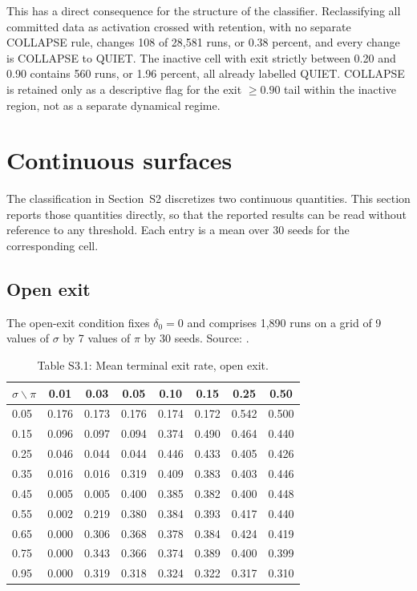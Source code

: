 \documentclass[12pt]{article}
\begin{document}
This has a direct consequence for the structure of the classifier. Reclassifying
all committed data as activation crossed with retention, with no separate
COLLAPSE rule, changes 108 of 28,581 runs, or 0.38 percent, and every change is
COLLAPSE to QUIET. The inactive cell with exit strictly between 0.20 and 0.90
contains 560 runs, or 1.96 percent, all already labelled QUIET. COLLAPSE is
retained only as a descriptive flag for the exit $\geq 0.90$ tail within the
inactive region, not as a separate dynamical regime.

\clearpage

\section{Continuous surfaces}
\label{sec:continuous}

The classification in Section~S2 discretizes two continuous quantities. This
section reports those quantities directly, so that the reported results can be
read without reference to any threshold. Each entry is a mean over 30 seeds for
the corresponding cell.

\subsection{Open exit}

The open-exit condition fixes $\delta_0=0$ and comprises 1,890 runs on a grid of
9 values of $\sigma$ by 7 values of $\pi$ by 30 seeds. Source:
.

\begin{table}[htbp]
\centering
\small
\caption{Table S3.1: Mean terminal exit rate, open exit.}
\begin{tabular}{lccccccc}
\toprule
$\sigma \backslash \pi$ & 0.01 & 0.03 & 0.05 & 0.10 & 0.15 & 0.25 & 0.50 \\
\midrule
0.05 & 0.176 & 0.173 & 0.176 & 0.174 & 0.172 & 0.542 & 0.500 \\
0.15 & 0.096 & 0.097 & 0.094 & 0.374 & 0.490 & 0.464 & 0.440 \\
0.25 & 0.046 & 0.044 & 0.044 & 0.446 & 0.433 & 0.405 & 0.426 \\
0.35 & 0.016 & 0.016 & 0.319 & 0.409 & 0.383 & 0.403 & 0.446 \\
0.45 & 0.005 & 0.005 & 0.400 & 0.385 & 0.382 & 0.400 & 0.448 \\
0.55 & 0.002 & 0.219 & 0.380 & 0.384 & 0.393 & 0.417 & 0.440 \\
0.65 & 0.000 & 0.306 & 0.368 & 0.378 & 0.384 & 0.424 & 0.419 \\
0.75 & 0.000 & 0.343 & 0.366 & 0.374 & 0.389 & 0.400 & 0.399 \\
0.95 & 0.000 & 0.319 & 0.318 & 0.324 & 0.322 & 0.317 & 0.310 \\
\bottomrule
\end{tabular}
\end{table}
\end{document}
